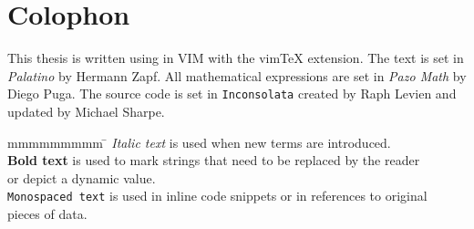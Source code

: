 
\vspace*{\fill}

\section*{Colophon}

This thesis is written using \LaTeXe{} in VIM with the vim\TeX{} extension. The
text is set in \textit{Palatino} by Hermann Zapf. All mathematical expressions
are set in \textit{Pazo Math} by Diego Puga. The source code is set in
\texttt{Inconsolata} created by Raph Levien and updated by Michael
Sharpe.

\begin{tabbing}
  mmmmmmmmm     \= \kill
  \textit{Italic text}     \> is used when new terms are introduced.\\
  \textbf{Bold text}       \> is used to mark strings that need to be replaced by the reader\\
                           \> or depict a dynamic value.\\
  \texttt{Monospaced text} \> is used in inline code snippets or in references to original\\
                           \> pieces of data.
\end{tabbing}


